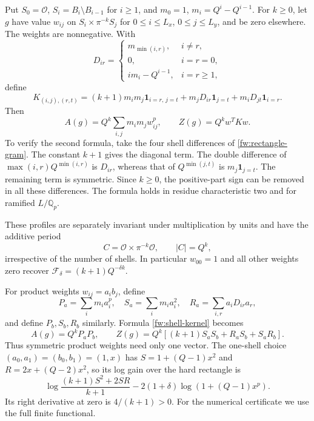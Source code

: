 Put $S_0=\mathcal O$, $S_i=B_i\setminus B_{i-1}$ for $i\ge1$, and
$m_0=1$, $m_i=Q^i-Q^{i-1}$. For $k\ge0$, let $g$ have value $w_{ij}$
on $S_i\times\pi^{-k}S_j$ for $0\le i\le L_x$, $0\le j\le L_y$, and
be zero elsewhere. The weights are nonnegative. With
\[
 D_{ir}=\begin{cases}
 m_{\min(i,r)},&i\ne r,\\
 0,&i=r=0,\\
 i m_i-Q^{i-1},&i=r\ge1,
 \end{cases}
\]
define
\[
 K_{(i,j),(r,t)}=(k+1)m_im_j\mathbf1_{i=r,\,j=t}
       +m_jD_{ir}\mathbf1_{j=t}+m_iD_{jt}\mathbf1_{i=r}.
\]
Then
\begin{equation}\label{fw:shell-kernel}
 A(g)=Q^k\sum_{i,j}m_im_jw_{ij}^p,\qquad Z(g)=Q^k w^TKw.
\end{equation}
To verify the second formula, take the four shell differences of
\eqref{fw:rectangle-gram}. The constant $k+1$ gives the diagonal
term. The double difference of $\max(i,r)Q^{\min(i,r)}$ is $D_{ir}$,
whereas that of $Q^{\min(j,t)}$ is $m_j\mathbf1_{j=t}$. The remaining
term is symmetric. Since $k\ge0$, the positive-part sign can be removed
in all these differences. The formula holds in residue characteristic
two and for ramified $L/\mathbb Q_p$.

These profiles are separately invariant under multiplication by units and
have the additive period
\begin{equation}\label{fw:hard-period}
 C=\mathcal O\times\pi^{-k}\mathcal O,\qquad |C|=Q^k,
\end{equation}
irrespective of the number of shells. In particular $w_{00}=1$ and all
other weights zero recover $\mathcal F_\delta=(k+1)Q^{-\delta k}$.

For product weights $w_{ij}=a_i b_j$, define
\[
 P_a=\sum_i m_i a_i^p,\quad S_a=\sum_i m_i a_i^2,\quad
 R_a=\sum_{i,r}a_iD_{ir}a_r,
\]
and define $P_b,S_b,R_b$ similarly. Formula
\eqref{fw:shell-kernel} becomes
\begin{equation}\label{fw:product-shells}
 A(g)=Q^kP_aP_b,\qquad
 Z(g)=Q^k[(k+1)S_aS_b+R_aS_b+S_aR_b].
\end{equation}
Thus symmetric product weights need only one vector. The one-shell choice
$(a_0,a_1)=(b_0,b_1)=(1,x)$ has
$S=1+(Q-1)x^2$ and $R=2x+(Q-2)x^2$, so its log gain over the hard
rectangle is
\begin{equation}\label{fw:one-shell-gain}
 \log\frac{(k+1)S^2+2SR}{k+1}
 -2(1+\delta)\log(1+(Q-1)x^p).
\end{equation}
Its right derivative at zero is $4/(k+1)>0$. For the numerical
certificate we use the full finite functional.

